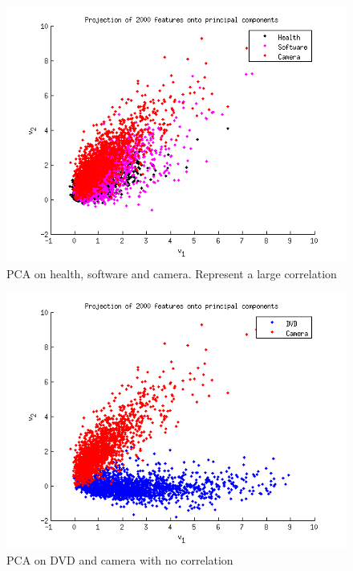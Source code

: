 \begin{figure}[H]
\centering
\includegraphics[scale = 0.5]{../Plottar/pca_largecorr.png}
\caption{PCA on health, software and camera. Represent a large correlation}
\label{fig:trainingsize}
\end{figure} 

\begin{figure}[H]
\centering
\includegraphics[scale = 0.5]{../Plottar/pca_nocorr.png}
\caption{PCA on DVD and camera with no correlation}
\label{fig:trainingsize}
\end{figure} 


